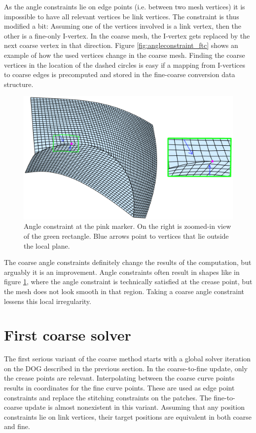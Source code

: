\documentclass[a4paper,twoside,12pt,nochapterprefix]{scrbook}
\begin{document}
As the angle constraints lie on edge points (i.e. between two mesh vertices) it is impossible to have all relevant vertices be link vertices. The constraint is thus modified a bit: Assuming one of the vertices involved is a link vertex, then the other is a fine-only I-vertex. In the coarse mesh, the I-vertex gets replaced by the next coarse vertex in that direction. Figure \ref{fig:angleconstraint_ftc} shows an example of how the used vertices change in the coarse mesh. Finding the coarse vertices in the location of the dashed circles is easy if a mapping from I-vertices to coarse edges is precomputed and stored in the fine-coarse conversion data structure.\newline
\begin{figure}
    \centering
    \includegraphics[width=0.9\linewidth]{figures/0308_angleconstraint_ugliness}
    \caption{Angle constraint at the pink marker. On the right is zoomed-in view of the green rectangle. Blue arrows point to vertices that lie outside the local plane.}
      \label{fig:angleconstraint_ugliness}
\end{figure}
The coarse angle constraints definitely change the results of the computation, but arguably it is an improvement. Angle constraints often result in shapes like in figure \ref{fig:angleconstraint_ugliness}, where the angle constraint is technically satisfied at the crease point, but the mesh does not look smooth in that region. Taking a coarse angle constraint lessens this local irregularity.\newline
\section{First coarse solver}\label{sec:first_coarse} 
The first serious variant of the coarse method starts with a global solver iteration on the DOG described in the previous section.\newline%
In the coarse-to-fine update, only the crease points are relevant. Interpolating between the coarse curve points results in coordinates for the fine curve points. These are used as edge point constraints and replace the stitching constraints on the patches.\newline
The fine-to-coarse update is almost nonexistent in this variant. Assuming that any position constraints lie on link vertices, their target positions are equivalent in both coarse and fine.\newline
\end{document}

